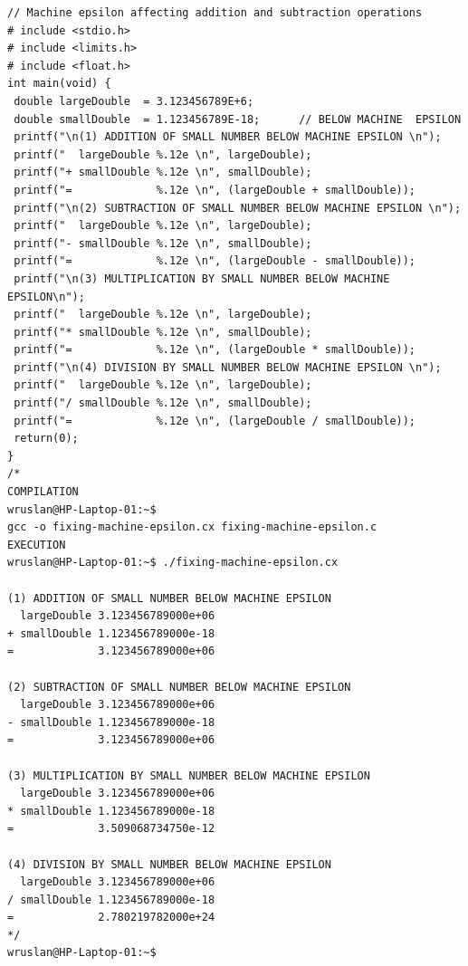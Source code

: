 \begin{lstlisting}[caption={Machine epsilon affecting addition and subtraction operations}, label=lst-Machine epsilon affecting addition and subtraction operations]	
// Machine epsilon affecting addition and subtraction operations
# include <stdio.h>
# include <limits.h> 
# include <float.h>
int main(void) {
 double largeDouble  = 3.123456789E+6;
 double smallDouble  = 1.123456789E-18;      // BELOW MACHINE  EPSILON 
 printf("\n(1) ADDITION OF SMALL NUMBER BELOW MACHINE EPSILON \n");
 printf("  largeDouble %.12e \n", largeDouble); 
 printf("+ smallDouble %.12e \n", smallDouble);
 printf("=             %.12e \n", (largeDouble + smallDouble));
 printf("\n(2) SUBTRACTION OF SMALL NUMBER BELOW MACHINE EPSILON \n");
 printf("  largeDouble %.12e \n", largeDouble); 
 printf("- smallDouble %.12e \n", smallDouble);
 printf("=             %.12e \n", (largeDouble - smallDouble));
 printf("\n(3) MULTIPLICATION BY SMALL NUMBER BELOW MACHINE EPSILON\n");
 printf("  largeDouble %.12e \n", largeDouble); 
 printf("* smallDouble %.12e \n", smallDouble);
 printf("=             %.12e \n", (largeDouble * smallDouble));
 printf("\n(4) DIVISION BY SMALL NUMBER BELOW MACHINE EPSILON \n");
 printf("  largeDouble %.12e \n", largeDouble); 
 printf("/ smallDouble %.12e \n", smallDouble);
 printf("=             %.12e \n", (largeDouble / smallDouble));
 return(0);
}
/*
COMPILATION
wruslan@HP-Laptop-01:~$ 
gcc -o fixing-machine-epsilon.cx fixing-machine-epsilon.c 
EXECUTION
wruslan@HP-Laptop-01:~$ ./fixing-machine-epsilon.cx 

(1) ADDITION OF SMALL NUMBER BELOW MACHINE EPSILON 
  largeDouble 3.123456789000e+06 
+ smallDouble 1.123456789000e-18 
=             3.123456789000e+06 

(2) SUBTRACTION OF SMALL NUMBER BELOW MACHINE EPSILON 
  largeDouble 3.123456789000e+06 
- smallDouble 1.123456789000e-18 
=             3.123456789000e+06 

(3) MULTIPLICATION BY SMALL NUMBER BELOW MACHINE EPSILON 
  largeDouble 3.123456789000e+06 
* smallDouble 1.123456789000e-18 
=             3.509068734750e-12 

(4) DIVISION BY SMALL NUMBER BELOW MACHINE EPSILON 
  largeDouble 3.123456789000e+06 
/ smallDouble 1.123456789000e-18 
=             2.780219782000e+24 
*/
wruslan@HP-Laptop-01:~$ 
\end{lstlisting}

